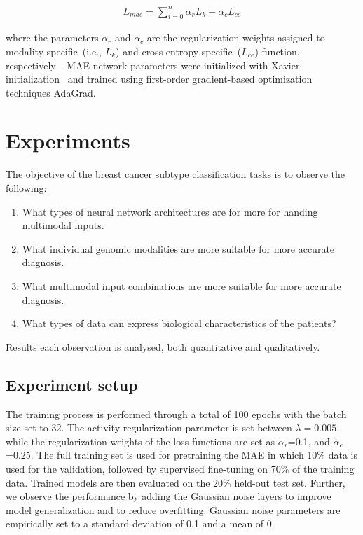 \begin{align}
    L_{mae}=\sum_{i=0}^{n} \alpha_{r} {L}_{k}+\alpha_{c} {L}_{ce}
    \label{eq:sum}
\end{align}

\hspace*{3.5mm} where the parameters $\alpha_{r}$ and $\alpha_{c}$ are the regularization weights assigned to modality specific~(i.e., ${L}_{k}$) and cross-entropy specific~(${L}_{ce}$) function, respectively~\cite{mmdcae}. MAE network parameters were initialized with Xavier initialization~\cite{xavier} and trained using first-order gradient-based optimization techniques AdaGrad. 

\section{Experiments}\label{chapter_4:results}
The objective of the breast cancer subtype classification tasks is to observe the following:

\begin{enumerate}[noitemsep]
    \item What types of neural network architectures are for more for handing multimodal inputs. 
    \item What individual genomic modalities are more suitable for more accurate diagnosis. 
    \item What multimodal input combinations are more suitable for more accurate diagnosis.
    \item What types of data can express biological characteristics of the patients? 
\end{enumerate}

\hspace*{3.5mm} Results each observation is analysed, both quantitative and qualitatively. 

\subsection{Experiment setup}
The training process is performed through a total of 100 epochs with the batch size set to $32$. The activity regularization parameter is set between $\lambda=0.005$, while the regularization weights of the loss functions are set as $\alpha_{r}$=0.1, and $\alpha_{c}$=0.25. The full training set is used for pretraining the MAE in which 10\% data is used for the validation, followed by supervised fine-tuning on 70\% of the training data. Trained models are then evaluated on the 20\% held-out test set. Further, we observe the performance by adding the Gaussian noise layers to improve model generalization and to reduce overfitting. Gaussian noise parameters are empirically set to a standard deviation of 0.1 and a mean of 0. 

